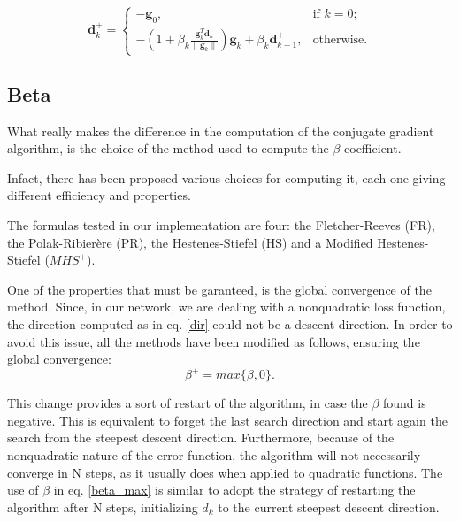 			\begin{equation}
			\label{mod_dir}
				\textbf{d}_k^+=\begin{cases}
			    -\textbf{g}_0, & \text{if $k=0$};\\
			    -(1 + \beta_k\frac{\textbf{g}_k^T\textbf{d}_{k}}{\|\textbf{g}_k\|})\textbf{g}_k + \beta_k\textbf{d}_{k-1}^+, & \text{otherwise.}
			  \end{cases}
			\end{equation}



		\subsection{Beta}
		\label{sub:beta}
			What really makes the difference in the computation of the conjugate gradient algorithm, is the choice of the method used to compute the $\beta$ coefficient.

			Infact, there has been proposed various choices for computing it, each one giving different efficiency and properties.

			The formulas tested in our implementation are four: the Fletcher-Reeves (FR), the Polak-Ribierère (PR), the Hestenes-Stiefel (HS) and a Modified Hestenes-Stiefel ($MHS^+$).

			One of the properties that must be garanteed, is the global convergence of the method. Since, in our network, we are dealing with a nonquadratic loss function, the direction computed as in eq. \ref{dir} could not be a descent direction. In order to avoid this issue, all the methods have been modified as follows, ensuring the global convergence:
			\begin{equation}
			\label{beta_max}
				 \beta^+ = max\{\beta, 0\}.
			\end{equation}

			This change provides a sort of restart of the algorithm, in case the $\beta$ found is negative. This is equivalent to forget the last search direction and start again the search from the steepest descent direction. Furthermore, because of the nonquadratic nature of the error function, the algorithm will not necessarily converge in N steps, as it usually does when applied to quadratic functions. The use of $\beta$ in eq. \ref{beta_max} is similar to adopt the strategy of restarting the algorithm after N steps, initializing $d_k$ to the current steepest descent direction.%

